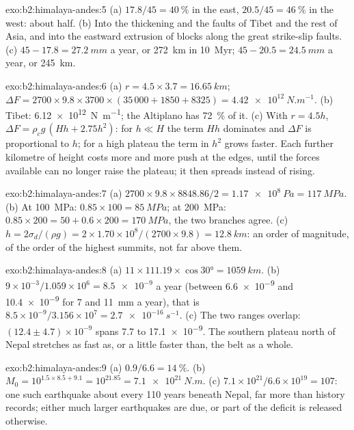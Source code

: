 \begin{solution}{exo:b2:himalaya-andes:5}
(a) $17.8/45 = \qty{40}{\percent}$ in the east, $20.5/45 = \qty{46}{\percent}$ in the west:
about half. (b) Into the thickening and the faults of Tibet and the rest of Asia, and into
the eastward extrusion of blocks along the great strike-slip faults. (c) $45 - 17.8 =
\qty{27.2}{mm}$ a year, or \qty{272}{km} in \qty{10}{Myr}; $45 - 20.5 = \qty{24.5}{mm}$ a
year, or \qty{245}{km}.
\end{solution}

\begin{solution}{exo:b2:himalaya-andes:6}
(a) $r = 4.5\times3.7 = \qty{16.65}{km}$; $\Delta F = 2700\times9.8\times3700\times(35\,000 +
1850 + 8325) = \qty{4.42e12}{N.m^{-1}}$. (b) Tibet: \qty{6.12e12}{N.m^{-1}}; the Altiplano
has \qty{72}{\percent} of it. (c) With $r = 4.5h$, $\Delta F = \rho_c g\,(Hh + 2.75h^2)$: for
$h \ll H$ the term $Hh$ dominates and $\Delta F$ is proportional to $h$; for a high plateau
the term in $h^2$ grows faster. Each further kilometre of height costs more and more push at
the edges, until the forces available can no longer raise the plateau; it then spreads
instead of rising.
\end{solution}

\begin{solution}{exo:b2:himalaya-andes:7}
(a) $2700\times9.8\times8848.86/2 = \qty{1.17e8}{Pa} = \qty{117}{MPa}$. (b) At
\qty{100}{MPa}: $0.85\times100 = \qty{85}{MPa}$; at \qty{200}{MPa}: $0.85\times200 = 50 +
0.6\times200 = \qty{170}{MPa}$, the two branches agree. (c) $h = 2\sigma_d/(\rho g) =
2\times1.70\times10^8/(2700\times9.8) = \qty{12.8}{km}$: an order of magnitude, of the order
of the highest summits, not far above them.
\end{solution}

\begin{solution}{exo:b2:himalaya-andes:8}
(a) $11\times111.19\times\cos\ang{30} = \qty{1059}{km}$. (b) $9\times10^{-3}/1.059\times10^{6}
= \num{8.5e-9}$ a year (between \num{6.6e-9} and \num{10.4e-9} for 7 and \qty{11}{mm} a year),
that is $8.5\times10^{-9}/3.156\times10^{7} = \qty{2.7e-16}{s^{-1}}$. (c) The two ranges
overlap: $(12.4 \pm 4.7) \times 10^{-9}$ spans 7.7 to \num{17.1e-9}. The southern plateau north of
Nepal stretches as fast as, or a little faster than, the belt as a whole.
\end{solution}

\begin{solution}{exo:b2:himalaya-andes:9}
(a) $0.9/6.6 = \qty{14}{\percent}$. (b) $M_0 = 10^{1.5\times8.5 + 9.1} = 10^{21.85} =
\qty{7.1e21}{N.m}$. (c) $7.1\times10^{21}/6.6\times10^{19} = 107$: one such earthquake about
every 110 years beneath Nepal, far more than history records; either much larger earthquakes
are due, or part of the deficit is released otherwise.
\end{solution}

